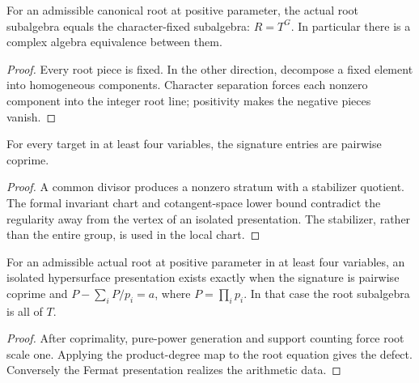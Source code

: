 \begin{theorem}
\label{thm:fixed}
\leanok
For an admissible canonical root at positive parameter, the actual root subalgebra equals the character-fixed subalgebra: $R=T^G$. In particular there is a complex algebra equivalence between them.
\end{theorem}
\begin{proof}
\leanok
{}
Every root piece is fixed. In the other direction, decompose a fixed element into homogeneous components. Character separation forces each nonzero component into the integer root line; positivity makes the negative pieces vanish.
\end{proof}

\begin{theorem}
\label{thm:coprime}
\leanok
For every target in at least four variables, the signature entries are pairwise coprime.
\end{theorem}
\begin{proof}
\leanok
{}
A common divisor produces a nonzero stratum with a stabilizer quotient. The formal invariant chart and cotangent-space lower bound contradict the regularity away from the vertex of an isolated presentation. The stabilizer, rather than the entire group, is used in the local chart.
\end{proof}

\begin{theorem}
\label{thm:higher-criterion}
\leanok
For an admissible actual root at positive parameter in at least four variables, an isolated hypersurface presentation exists exactly when the signature is pairwise coprime and
$P-\sum_iP/p_i=a$, where $P=\prod_ip_i$. In that case the root subalgebra is all of $T$.
\end{theorem}
\begin{proof}
\leanok
{}
After coprimality, pure-power generation and support counting force root scale one. Applying the product-degree map to the root equation gives the defect. Conversely the Fermat presentation realizes the arithmetic data.
\end{proof}

